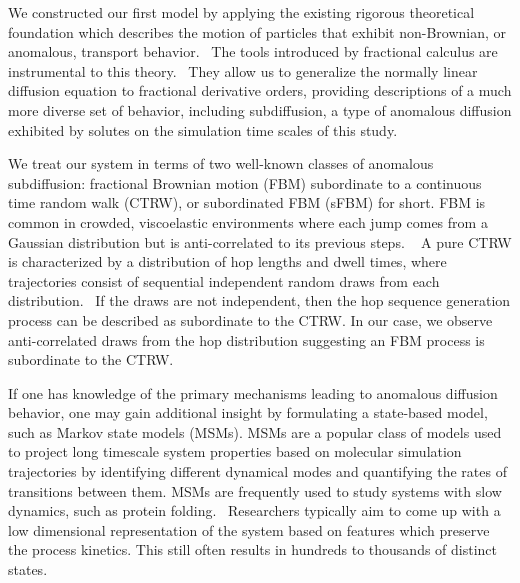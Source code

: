 \documentclass[journal=ancac3,manuscript=article,layout=twocolumn]{achemso}
\begin{document}
  We constructed our first model by applying the existing rigorous theoretical
  foundation which describes the motion of particles that exhibit non-Brownian,
  or anomalous, transport behavior.~\cite{metzler_random_2000,bouchaud_anomalous_1990} 
  The tools introduced by fractional calculus are instrumental to this 
  theory.~\cite{gorenflo_fractional_1997} They allow us to generalize the normally
  linear diffusion equation to fractional derivative orders, providing descriptions
  of a much more diverse set of behavior, including subdiffusion, a type of 
  anomalous diffusion exhibited by solutes on the simulation time scales of this
  study.~\cite{klages_anomalous_2008}

  We treat our system in terms of two well-known classes of anomalous
  subdiffusion: fractional Brownian motion (FBM) subordinate to a 
  continuous time random walk (CTRW), or subordinated FBM (sFBM) for short. 
  FBM is common in crowded, viscoelastic environments where each jump comes 
  from a Gaussian distribution but is anti-correlated to its previous steps.
  ~\cite{mandelbrot_fractional_1968,jeon_fractional_2010,banks_anomalous_2005}
  A pure CTRW is characterized by a distribution of hop lengths and dwell times, 
  where trajectories consist of sequential independent random draws from each
  distribution.~\cite{montroll_random_1965} If the draws are not independent,
  then the hop sequence generation process can be described as subordinate to
  the CTRW. In our case, we observe anti-correlated draws from the hop distribution
  suggesting an FBM process is subordinate to the CTRW.
  
  
  If one has knowledge of the primary mechanisms leading to anomalous diffusion
  behavior, one may gain additional insight by formulating a state-based model,
  such as Markov state models (MSMs). MSMs are a popular class of models used
  to project long timescale system properties based on molecular simulation
  trajectories by identifying different dynamical modes and quantifying the
  rates of transitions between them. MSMs are frequently used to study systems
  with slow dynamics, such as protein
  folding.~\cite{snow_how_2005,chodera_automatic_2007} Researchers typically
  aim to come up with a low dimensional representation of the system based on
  features which preserve the process kinetics. This still often results in
  hundreds to thousands of distinct states.~\cite{chodera_markov_2014}
\end{document}
